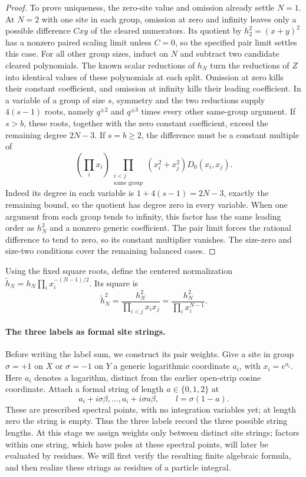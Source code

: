 \begin{proof}
To prove uniqueness, the zero-site value and omission already settle
$N=1$. At $N=2$ with one site in each group, omission at zero and
infinity leaves only a possible difference $Cxy$ of the cleared
numerators. Its quotient by $h_2^2=(x+y)^2$ has a nonzero paired
scaling limit unless $C=0$, so the specified pair limit settles this
case. For all other group sizes, induct on $N$ and subtract two
candidate cleared polynomials. The known
scalar reductions of $h_N$ turn the reductions of $Z$ into identical
values of these polynomials at each split. Omission at zero kills
their constant coefficient, and
omission at infinity kills their leading coefficient. In a variable
of a group of size $s$, symmetry and the two reductions supply
$4(s-1)$ roots, namely $q^{\pm2}$ and $q^{\pm3}$ times every other
same-group argument. If $s>b$, these roots, together with the zero
constant coefficient, exceed the remaining degree $2N-3$.
If $s=b\ge2$, the difference must be a constant multiple of
\begin{equation}\label{eq:02-uniqueness-factor}
 \left(\prod_i x_i\right)
 \prod_{\substack{i<j\\\text{same group}}}
       (x_i^2+x_j^2)D_0(x_i,x_j).
\end{equation}
Indeed its degree in each variable is $1+4(s-1)=2N-3$, exactly the
remaining bound, so the quotient has degree zero in every variable.
When one argument from each group tends to infinity, this factor has
the same leading order as $h_N^2$ and a nonzero generic coefficient.
The pair limit forces the rational difference to tend to zero, so
its constant multiplier vanishes. The size-zero and size-two
conditions cover the remaining balanced cases.
\end{proof}

Using the fixed square roots, define the centered normalization
$\widetilde h_N=h_N\prod_i x_i^{-(N-1)/2}$. Its square is
\[
 \widetilde h_N^2=\frac{h_N^2}{\prod_{i<j}x_ix_j}
                 =\frac{h_N^2}{\prod_i x_i^{N-1}}.
\]
\paragraph{The three labels as formal site strings.}
Before writing the label sum, we construct its pair weights. Give a
site in group $\sigma=+1$ on $X$ or $\sigma=-1$ on $Y$ a generic
logarithmic coordinate $a_i$, with $x_i=e^{a_i}$. Here $a_i$ denotes
a logarithm, distinct from the earlier open-strip cosine coordinate.
Attach a formal string of length $a\in\{0,1,2\}$ at
\[
 a_i+i\sigma\beta,\ldots,a_i+i\sigma a\beta,
 \qquad l=\sigma(1-a).
\]
These are prescribed spectral points, with no integration variables
yet; at length zero the string is empty. Thus the three labels record
the three possible string lengths.
At this stage we assign weights only between distinct site strings;
factors within one string, which have poles at these spectral points,
will later be evaluated by residues.
We will first verify the resulting finite algebraic formula, and then
realize these strings as residues of a particle integral.

